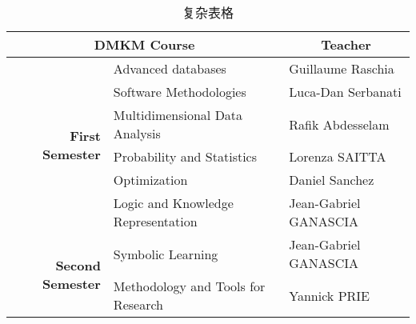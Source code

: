 \documentclass{article}
\begin{document}
\begin{table}

\caption{复杂表格}
\label{exercice_3.2}


\begin{tabular}{|r|l|l|}

\hline
\multicolumn{2}{|c|}{\bf DMKM Course} &  \multicolumn{1}{|c|}{\bf Teacher}
\\
\hline

\multirow{6}{*}{ \bf First Semester} & Advanced databases  & Guillaume Raschia
\\
\cline{2-3}
&Software Methodologies & Luca-Dan Serbanati
\\
\cline{2-3}
&Multidimensional Data Analysis & Rafik Abdesselam
\\
\cline{2-3}
&Probability and Statistics & Lorenza SAITTA
\\
\cline{2-3}
&Optimization & Daniel Sanchez
\\
\cline{2-3}
&Logic and Knowledge Representation & Jean-Gabriel GANASCIA
\\
\hline



\multirow{2}{*}{ \bf Second Semester} & Symbolic Learning  & Jean-Gabriel GANASCIA
\\
\cline{2-3}
&Methodology and Tools for Research & Yannick PRIE
\\
\hline


\end{tabular}

\end{table}
\end{document}
